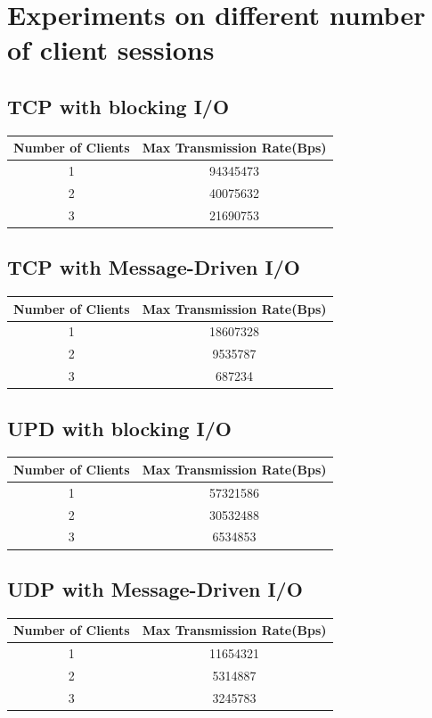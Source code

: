 \documentclass[11pt]{article}
\begin{document}
\section{Experiments on different number of client sessions}
\subsection{TCP with blocking I/O}
\begin{center}
\begin{tabular}{cc}
Number of Clients & Max Transmission Rate(Bps) \\ [0.5ex]
\hline\hline
1 & 94345473 \\
2 & 40075632 \\
3 & 21690753 \\
\hline
\end{tabular}
\end{center}

\subsection{TCP with Message-Driven I/O}
\begin{center}
\begin{tabular}{cc}
Number of Clients & Max Transmission Rate(Bps) \\ [0.5ex]
\hline\hline
1 & 18607328 \\
2 & 9535787 \\
3 & 687234\\
\hline
\end{tabular}
\end{center}

\subsection{UPD with blocking I/O}
\begin{center}
\begin{tabular}{cc}
Number of Clients & Max Transmission Rate(Bps) \\ [0.5ex]
\hline\hline
1 & 57321586 \\
2 & 30532488 \\
3 & 6534853 \\
\hline
\end{tabular}
\end{center}

\subsection{UDP with Message-Driven I/O}
\begin{center}
\begin{tabular}{cc}
Number of Clients & Max Transmission Rate(Bps) \\ [0.5ex]
\hline\hline
1 & 11654321 \\
2 & 5314887 \\
3 & 3245783 \\
\hline
\end{tabular}
\end{center}
\end{document}
